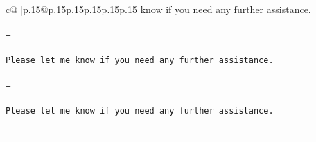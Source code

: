 \documentclass{article}
\begin{document}
{\begin{supertabular}{c@{$\;$}|p{.15\linewidth}@{}p{.15\linewidth}p{.15\linewidth}p{.15\linewidth}p{.15\linewidth}p{.15\linewidth}}
{{{ know if you need any further assistance. \\ \tt \\ \tt ---\\ \tt \\ \tt Please let me know if you need any further assistance. \\ \tt \\ \tt ---\\ \tt \\ \tt Please let me know if you need any further assistance. \\ \tt \\ \tt ---\\ \tt \\ }}}
\end{supertabular}}
\end{document}
